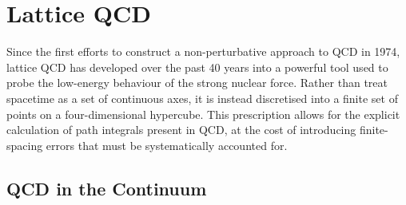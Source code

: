 
\chapter{Lattice QCD}

\ifpdf
    \graphicspath{{Chapter2/Figs/Raster/}{Chapter2/Figs/PDF/}{Chapter2/Figs/}}
\else
    \graphicspath{{Chapter2/Figs/Vector/}{Chapter2/Figs/}}
\fi
Since the first efforts to construct a non-perturbative approach to QCD in 1974\cite{Wilson:1974sk}, lattice QCD has developed over the past 40 years into a powerful tool used to probe the low-energy behaviour of the strong nuclear force. Rather than treat spacetime as a set of continuous axes, it is instead discretised into a finite set of points on a four-dimensional hypercube. This prescription allows for the explicit calculation of path integrals present in QCD, at the cost of introducing finite-spacing errors that must be systematically accounted for.

\section{QCD in the Continuum}


